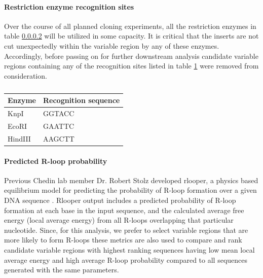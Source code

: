 \documentclass[11pt]{article}
\begin{document}
\paragraph{Restriction enzyme recognition sites}

Over the course of all planned cloning experiments, all the restriction enzymes in table \ref{} will be utilized in some capacity. It is critical that the inserts are not cut unexpectedly within the variable region by any of these enzymes. Accordingly, before passing on for further downstream analysis candidate variable regions containing any of the recognition sites listed in table \ref{tab:enzymes} were removed from consideration.

\begin{table}[H]
	\caption{}
	\label{tab:enzymes}
	\centering
	\begin{tabular}{@{}ll@{}}
		\toprule
		Enzyme  & Recognition sequence \\ \midrule
		KnpI    & GGTACC               \\
		EcoRI   & GAATTC               \\
		HindIII & AAGCTT               \\ \bottomrule
	\end{tabular}
\end{table}


\paragraph{Predicted R-loop probability}

Previous Chedin lab member Dr. Robert Stolz developed rlooper, a physics based equilibrium model for predicting the probability of R-loop formation over a given DNA sequence \cite{Stolz2019}. Rlooper output includes a predicted probability of R-loop formation at each base in the input sequence, and the calculated average free energy (local average energy) from all R-loops overlapping that particular nucleotide. Since, for this analysis, we prefer to select variable regions that are more likely to form R-loops these metrics are also used to compare and rank candidate variable regions with highest ranking sequences having low mean local average energy and high average R-loop probability compared to all sequences generated with the same parameters. 
\end{document}
